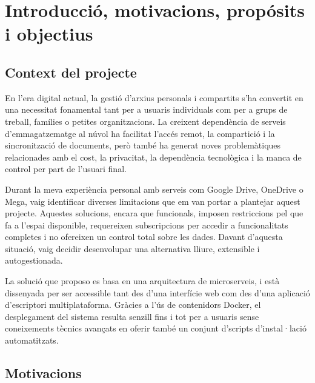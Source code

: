 
\nocite{*} 

\chapter{Introducci\'o, motivacions, prop\'osits i objectius}

\section{Context del projecte}

En l'era digital actual, la gesti\'o d'arxius personals i compartits s'ha convertit en una necessitat fonamental tant per a usuaris individuals com per a grups de treball, fam\'ilies o petites organitzacions. La creixent depend\`encia de serveis d'emmagatzematge al n\'uvol ha facilitat l'acc\'es remot, la compartici\'o i la sincronitzaci\'o de documents, per\`o tamb\'e ha generat noves problem\`atiques relacionades amb el cost, la privacitat, la depend\`encia tecnol\`ogica i la manca de control per part de l'usuari final.

Durant la meva experi\`encia personal amb serveis com Google Drive, OneDrive o Mega, vaig identificar diverses limitacions que em van portar a plantejar aquest projecte. Aquestes solucions, encara que funcionals, imposen restriccions pel que fa a l'espai disponible, requereixen subscripcions per accedir a funcionalitats completes i no ofereixen un control total sobre les dades. Davant d'aquesta situaci\'o, vaig decidir desenvolupar una alternativa lliure, extensible i autogestionada.

La soluci\'o que proposo es basa en una arquitectura de microserveis, i est\`a dissenyada per ser accessible tant des d'una interf\'icie web com des d'una aplicaci\'o d'escriptori multiplataforma. Gr\`acies a l'\'us de contenidors Docker, el desplegament del sistema resulta senzill fins i tot per a usuaris sense coneixements t\`ecnics avan\c{c}ats en oferir tamb\'e un conjunt d'scripts d'instal·laci\'o automatitzats.

\section{Motivacions}


